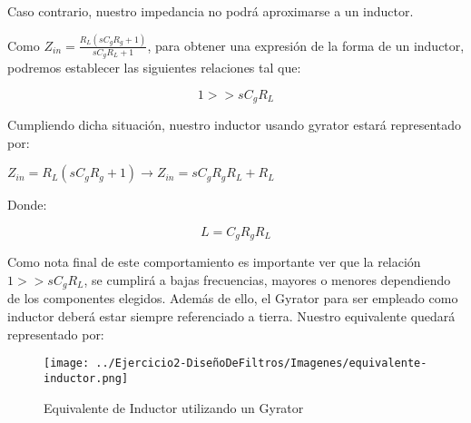 Caso contrario, nuestro impedancia no podrá aproximarse a un inductor.

Como $Z_{in}=\frac{R_L(sC_gR_g+1)}{sC_gR_L+1}$, para obtener una expresión de la forma de un inductor,
podremos establecer las siguientes relaciones tal que:

$$1 >> sC_gR_L$$

Cumpliendo dicha situación, nuestro inductor usando gyrator estará representado por:

$Z_{in}=R_L(sC_gR_g+1)\longrightarrow Z_{in}=sC_gR_gR_L+R_L$

Donde:

$$L=C_gR_gR_L$$

Como nota final de este comportamiento es importante ver que la relación $1 >> sC_gR_L$, se cumplirá a bajas frecuencias,
mayores o menores dependiendo de los componentes elegidos. Además de ello, el Gyrator para ser empleado como inductor deberá estar
siempre referenciado a tierra. Nuestro equivalente quedará representado por:

\begin{figure}[H]
    \centering
    \texttt{[image: ../Ejercicio2-DiseñoDeFiltros/Imagenes/equivalente-inductor.png]}
    \caption{Equivalente de Inductor utilizando un Gyrator}
\end{figure}


